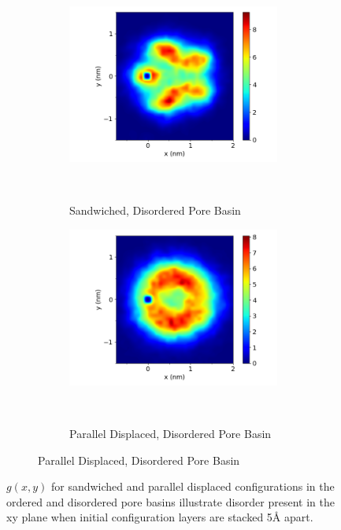 \documentclass[journal=jpcbfk,manusciprt=article]{achemso}
\begin{document}
\begin{figure}
\begin{subfigure}{1\linewidth}
\begin{subfigure}{0.47\linewidth}
        \end{subfigure}
        \begin{subfigure}{0.47\linewidth}
                \centering
                \includegraphics[width=\linewidth]{disorder_xy_correlation.png}
                \caption{Sandwiched, Disordered Pore Basin}~\label{fig:disorder_sandwich_xy_correlation}
        \end{subfigure}%
        \begin{subfigure}{0.47\linewidth}
                \centering
                \includegraphics[width=\linewidth]{disorder_offset_xy_correlation.png}
                \caption{Parallel Displaced, Disordered Pore Basin}~\label{fig:disorder_offset_xy_correlation}
        \end{subfigure}
  \end{subfigure}
  \caption{$g(x,y)$ for sandwiched and parallel displaced configurations in the
	  ordered and disordered pore basins illustrate disorder present in the xy plane
	  when initial configuration layers are stacked 5\AA
	  apart.}\label{fig:xy_correlation}
  \end{figure}
\end{document}
